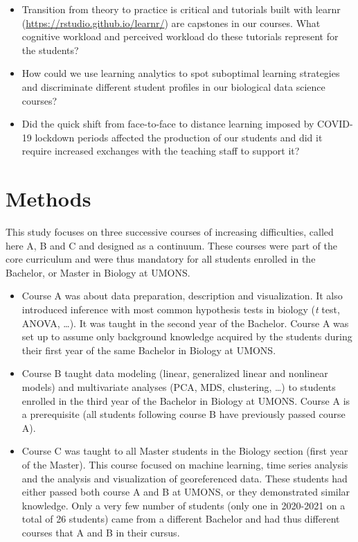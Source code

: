 \documentclass{aims}
\theoremstyle{definition}
\begin{document}
\begin{itemize}
\item
  Transition from theory to practice is critical and tutorials built
  with learnr (\url{https://rstudio.github.io/learnr/}) are capstones in
  our courses. What cognitive workload and perceived workload do these
  tutorials represent for the students?
\item
  How could we use learning analytics to spot suboptimal learning
  strategies and discriminate different student profiles in our
  biological data science courses?
\item
  Did the quick shift from face-to-face to distance learning imposed by
  COVID-19 lockdown periods affected the production of our students and
  did it require increased exchanges with the teaching staff to support
  it?
\end{itemize}

\hypertarget{methods}{%
\section{Methods}\label{methods}}

This study focuses on three successive courses of increasing
difficulties, called here A, B and C and designed as a continuum. These
courses were part of the core curriculum and were thus mandatory for all
students enrolled in the Bachelor, or Master in Biology at UMONS.

\begin{itemize}
\item
  Course A was about data preparation, description and visualization. It
  also introduced inference with most common hypothesis tests in biology
  (\emph{t} test, ANOVA, \ldots). It was taught in the second year of
  the Bachelor. Course A was set up to assume only background knowledge
  acquired by the students during their first year of the same Bachelor
  in Biology at UMONS.
\item
  Course B taught data modeling (linear, generalized linear and
  nonlinear models) and multivariate analyses (PCA, MDS, clustering,
  \ldots) to students enrolled in the third year of the Bachelor in
  Biology at UMONS. Course A is a prerequisite (all students following
  course B have previously passed course A).
\item
  Course C was taught to all Master students in the Biology section
  (first year of the Master). This course focused on machine learning,
  time series analysis and the analysis and visualization of
  georeferenced data. These students had either passed both course A and
  B at UMONS, or they demonstrated similar knowledge. Only a very few
  number of students (only one in 2020-2021 on a total of 26 students)
  came from a different Bachelor and had thus different courses that A
  and B in their cursus.
\end{itemize}
\end{document}

